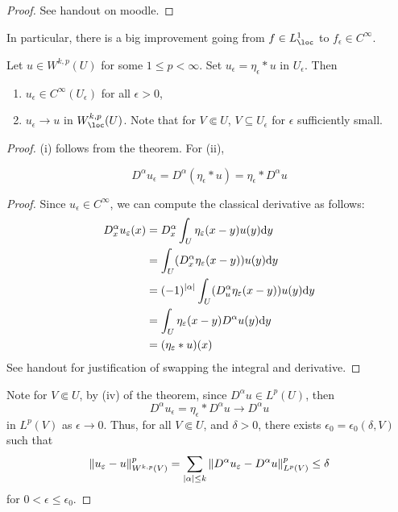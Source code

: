 \documentclass{article}
\begin{document}
\begin{proof}
    See handout on moodle.
\end{proof}

In particular, there is a big improvement going from \(f \in L^1_\loc\) to \(f_\epsilon \in C^\infty\).

\begin{lemma}
     \label{lem:local-smooth-approx-away-from-boundary}Let \(u \in W^{k, p}(U)\) for some \(1 \le p < \infty\). Set \(u_\epsilon = \eta_\epsilon * u\) in \(U_\epsilon\). Then
    \begin{enumerate}
        \item \(u_\epsilon \in C^\infty(U_\epsilon)\) for all \(\epsilon > 0\),
        \item \(u_\epsilon \to u\) in \(W^{k, p}_\loc(U)\). Note that for \(V \Subset U\), \(V \subseteq U_\epsilon\) for \(\epsilon\) sufficiently small.
    \end{enumerate}
\end{lemma}

\begin{proof}
    (i) follows from the theorem. For (ii),
    \begin{claim}
        \[D^\alpha u_\epsilon = D^\alpha(\eta_\epsilon * u) = \eta_\epsilon * D^\alpha u\]
    \end{claim}
    \begin{proof}
        Since \(u_\epsilon \in C^\infty\), we can compute the classical derivative as follows:
        \begin{align*}
            D^\alpha_x u_\varepsilon(x) &= D^\alpha_x\int_U \eta_\varepsilon(x - y)u(y) \dd y \\
            &= \int_U (D^\alpha_x\eta_\varepsilon(x - y))u(y) \dd y \\
            &= (-1)^\abs{\alpha}\int_U(D^\alpha_u\eta_\varepsilon(x - y))u(y) \dd y \\
            &= \int_U \eta_\varepsilon(x - y)D^\alpha u(y) \dd y \\
            &= (\eta_\varepsilon * u)(x)
        \end{align*}
        See handout for justification of swapping the integral and derivative.
    \end{proof}
    Note for \(V \Subset U\), by (iv) of the theorem, since \(D^\alpha u \in L^p(U)\), then
    \[D^\alpha u_\epsilon = \eta_\epsilon * D^\alpha u \to D^\alpha u\]
    in \(L^p(V)\) as \(\epsilon \to 0\). Thus, for all \(V \Subset U\), and \(\delta > 0\), there exists \(\epsilon_0 = \epsilon_0(\delta, V)\) such that
    \begin{align*}
        \norm{u_\varepsilon - u}_{W^{k, p}(V)}^p = \sum_{\abs{\alpha} \le k}\norm{D^\alpha u_\varepsilon - D^\alpha u}_{L^p(V)}^p \le \delta
    \end{align*}
    for \(0 < \epsilon \le \epsilon_0\).
\end{proof}
\end{document}
